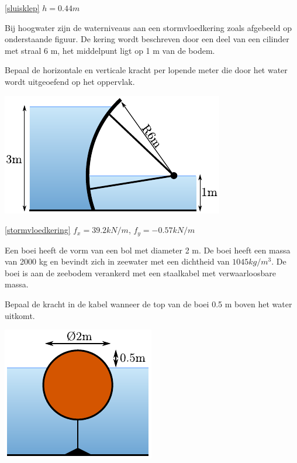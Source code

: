 \begin{antwoord}{\ref{sluisklep}}
	$h = 0.44\unit{m}$
\end{antwoord}
\begin{toepassing}[*]
	\label{stormvloedkering}
Bij hoogwater zijn de waterniveaus aan een stormvloedkering zoals afgebeeld op onderstaande figuur. De kering wordt beschreven door een deel van een cilinder met straal 6 m, het middelpunt ligt op 1 m van de bodem.
		
Bepaal de horizontale en verticale kracht per lopende meter die door het water wordt uitgeoefend op het oppervlak.

	\centering
	\includegraphics{fig/hydrostatica/stormvloedkering}
\end{toepassing}
\begin{antwoord}{\ref{stormvloedkering}}
	$f_x = 39.2\unit{kN/m}$, $f_y = -0.57\unit{kN/m}$
\end{antwoord}
\begin{toepassing}
	\label{boei}
Een boei heeft de vorm van een bol met diameter 2 m. De boei heeft een massa van 2000 kg en bevindt zich in zeewater met een dichtheid van $1045\unit{kg/m^3}$. De boei is aan de zeebodem verankerd met een staalkabel met verwaarloosbare massa.
		
Bepaal de kracht in de kabel wanneer de top van de boei 0.5 m boven het water uitkomt.

	\centering
	\includegraphics{fig/hydrostatica/boei}
\end{toepassing}
